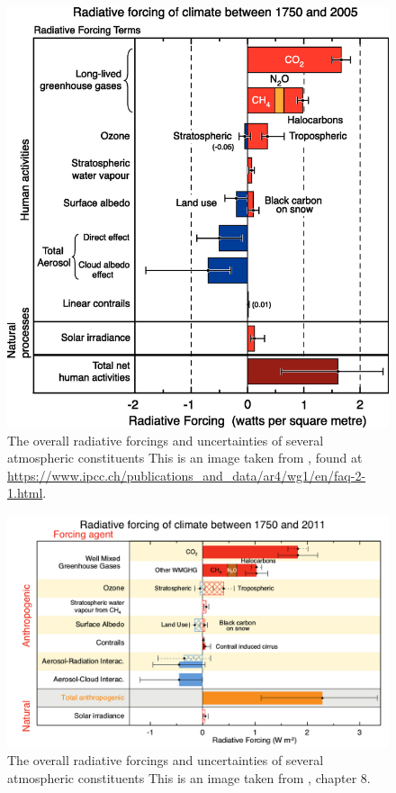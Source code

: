     \begin{figure}
      \includegraphics[width=\textwidth]{Figures/IPCC_WG1AR4_RFSummary.png}
      \caption{%
        The overall radiative forcings and uncertainties of several atmospheric constituents
        This is an image taken from \textcite{IPCC_Chapter2}, found at \url{https://www.ipcc.ch/publications_and_data/ar4/wg1/en/faq-2-1.html}.}
     \label{LR:VOCs:IsopCascade:RF:fig_IPCC_RF_AR4}
    \end{figure}
    
    \begin{figure}
      \includegraphics[width=\textwidth]{Figures/IPCC_WG1AR5_RFSummary.png}
      \caption{%
        The overall radiative forcings and uncertainties of several atmospheric constituents
        This is an image taken from \textcite{IPCC_AR5_WG1}, chapter 8.}
      \label{LR:VOCs:IsopCascade:RF:fig_IPCC_RF_AR5}
    \end{figure}    
    
